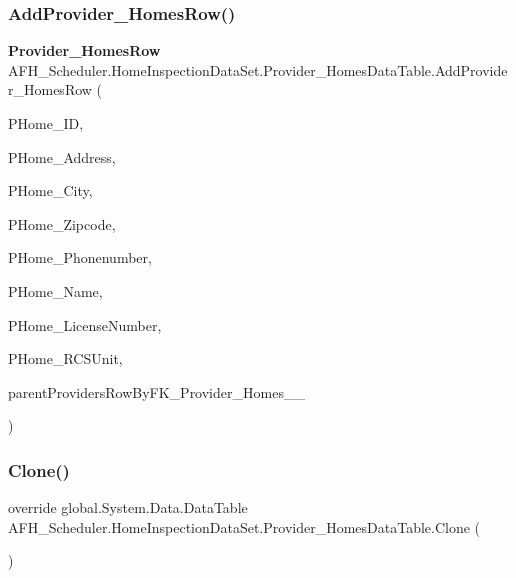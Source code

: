 \mbox{\label{class_a_f_h___scheduler_1_1_home_inspection_data_set_1_1_provider___homes_data_table_ab00757ddb6f1771f80819e118f9e116a}} 
\subsubsection{AddProvider\_HomesRow()\hspace{0.1cm}{\footnotesize\ttfamily [2/2]}}
{\footnotesize\ttfamily \textbf{ Provider\+\_\+\+Homes\+Row} A\+F\+H\+\_\+\+Scheduler.\+Home\+Inspection\+Data\+Set.\+Provider\+\_\+\+Homes\+Data\+Table.\+Add\+Provider\+\_\+\+Homes\+Row (\begin{DoxyParamCaption}\item[{long}]{P\+Home\+\_\+\+ID,  }\item[{string}]{P\+Home\+\_\+\+Address,  }\item[{string}]{P\+Home\+\_\+\+City,  }\item[{string}]{P\+Home\+\_\+\+Zipcode,  }\item[{string}]{P\+Home\+\_\+\+Phonenumber,  }\item[{string}]{P\+Home\+\_\+\+Name,  }\item[{string}]{P\+Home\+\_\+\+License\+Number,  }\item[{string}]{P\+Home\+\_\+\+R\+C\+S\+Unit,  }\item[{\textbf{ Providers\+Row}}]{parent\+Providers\+Row\+By\+F\+K\+\_\+\+Provider\+\_\+\+Homes\+\_\+\_ }\end{DoxyParamCaption})}

\mbox{\label{class_a_f_h___scheduler_1_1_home_inspection_data_set_1_1_provider___homes_data_table_afcb1ef95bb62817ecf5c0fd8464a2478}} 
\subsubsection{Clone()}
{\footnotesize\ttfamily override global.\+System.\+Data.\+Data\+Table A\+F\+H\+\_\+\+Scheduler.\+Home\+Inspection\+Data\+Set.\+Provider\+\_\+\+Homes\+Data\+Table.\+Clone (\begin{DoxyParamCaption}{ }\end{DoxyParamCaption})}

